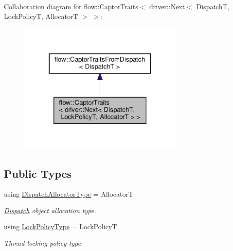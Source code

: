 Collaboration diagram for flow\+:\+:Captor\+Traits$<$ driver\+:\+:Next$<$ DispatchT, Lock\+PolicyT, AllocatorT $>$ $>$\+:\nopagebreak
\begin{figure}[H]
\begin{center}
\leavevmode
\includegraphics[width=236pt]{structflow_1_1_captor_traits_3_01driver_1_1_next_3_01_dispatch_t_00_01_lock_policy_t_00_01_allocator_t_01_4_01_4__coll__graph}
\end{center}
\end{figure}
\subsection*{Public Types}
\begin{DoxyCompactItemize}
\item 
\mbox{\label{structflow_1_1_captor_traits_3_01driver_1_1_next_3_01_dispatch_t_00_01_lock_policy_t_00_01_allocator_t_01_4_01_4_aa8dbb28981c79c035b9e63a3ec15bcea}} 
using \hyperlink{structflow_1_1_captor_traits_3_01driver_1_1_next_3_01_dispatch_t_00_01_lock_policy_t_00_01_allocator_t_01_4_01_4_aa8dbb28981c79c035b9e63a3ec15bcea}{Dispatch\+Allocator\+Type} = AllocatorT
\begin{DoxyCompactList}\small\item\em \hyperlink{classflow_1_1_dispatch}{Dispatch} object allocation type. \end{DoxyCompactList}\item 
\mbox{\label{structflow_1_1_captor_traits_3_01driver_1_1_next_3_01_dispatch_t_00_01_lock_policy_t_00_01_allocator_t_01_4_01_4_a8a693c077322b7e1e7cf95b0e87b5d16}} 
using \hyperlink{structflow_1_1_captor_traits_3_01driver_1_1_next_3_01_dispatch_t_00_01_lock_policy_t_00_01_allocator_t_01_4_01_4_a8a693c077322b7e1e7cf95b0e87b5d16}{Lock\+Policy\+Type} = Lock\+PolicyT
\begin{DoxyCompactList}\small\item\em Thread locking policy type. \end{DoxyCompactList}\end{DoxyCompactItemize}


